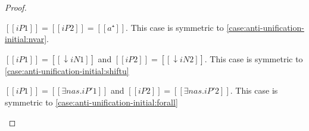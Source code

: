 \begin{proof}
\begin{caseof}
        \item $[[iP1]] = [[iP2]] = [[a⁺]]$. This case is symmetric to \cref{case:anti-unification-initial:nvar}.
        \item $[[iP1]] = [[↓iN1]]$ and $[[iP2]] = [[↓iN2]]$. This case is symmetric to \cref{case:anti-unification-initial:shiftu}
        \item $[[iP1]] = [[∃nas.iP'1]]$ and $[[iP2]] = [[∃nas.iP'2]]$. This case is symmetric to \cref{case:anti-unification-initial:forall}
        \end{caseof}
\end{proof}